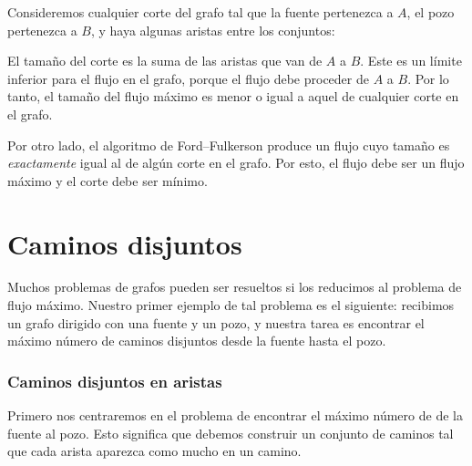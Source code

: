 Consideremos cualquier corte del grafo tal que la fuente pertenezca
a $A$, el pozo pertenezca a $B$, y haya algunas aristas entre los
conjuntos:

\begin{center}
\end{center}

El tamaño del corte es la suma de las aristas que van de $A$ a $B$.
Este es un límite inferior para el flujo en el grafo, porque el flujo
debe proceder de $A$ a $B$. Por lo tanto, el tamaño del flujo máximo
es menor o igual a aquel de cualquier corte en el grafo.

Por otro lado, el algoritmo de Ford--Fulkerson produce un flujo
cuyo tamaño es \emph{exactamente} igual al de algún corte en el grafo.
Por esto, el flujo debe ser un flujo máximo y el corte debe ser mínimo.

\section{Caminos disjuntos}

Muchos problemas de grafos pueden ser resueltos si los reducimos al
problema de flujo máximo. Nuestro primer ejemplo de tal problema es el
siguiente: recibimos un grafo dirigido con una fuente y un pozo, y
nuestra tarea es encontrar el máximo número de caminos disjuntos desde
la fuente hasta el pozo.

\subsubsection{Caminos disjuntos en aristas}

Primero nos centraremos en el problema de encontrar el máximo número
de  de la fuente al pozo. Esto
significa que debemos construir un conjunto de caminos tal que cada
arista aparezca como mucho en un camino.

